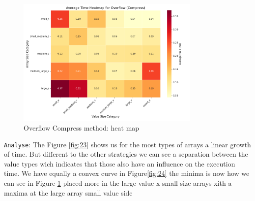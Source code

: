 \documentclass[11pt, a4paper]{article}
\begin{document}
	\begin{figure}[H]%
		\centering
		\includegraphics[width=0.8\textwidth]{Grafics/Overflow/OverflowCompressHeat.png}
		\caption{Overflow Compress method: heat map}
		\label{fig:25}
	\end{figure}
	\texttt{Analyse}: The Figure \ref{fig:23} shows us for the most types of arrays a linear growth of time. But different to the other strategies we can see a separation between the value types wich indicates that those also have an influence on the execution time. We have equally a convex curve in Figure\ref{fig:24} the minima is now how we can see in Figure \ref{fig:25} placed more in the large value x small size arrays xith a maxima at the large array small value side 
	\par %
	
	
\end{document}
